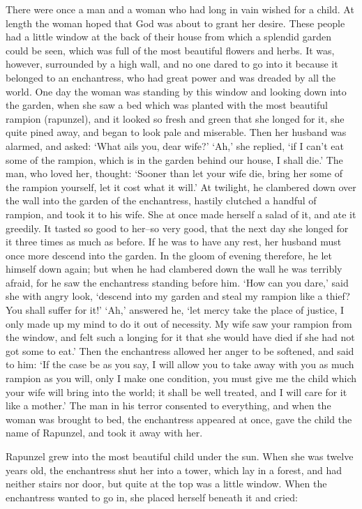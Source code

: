 \documentclass[oneside,11pt]{book} %
\begin{document}
There were once a man and a woman who had long in vain wished for a child. At length the woman hoped that God was about to grant her desire. These people had a little window at the back of their house from which a splendid garden could be seen, which was full of the most beautiful flowers and herbs. It was, however, surrounded by a high wall, and no one dared to go into it because it belonged to an enchantress, who had great power and was dreaded by all the world. One day the woman was standing by this window and looking down into the garden, when she saw a bed which was planted with the most beautiful rampion (rapunzel), and it looked so fresh and green that she longed for it, she quite pined away, and began to look pale and miserable. Then her husband was alarmed, and asked: `What ails you, dear wife?' `Ah,' she replied, `if I can't eat some of the rampion, which is in the garden behind our house, I shall die.' The man, who loved her, thought: `Sooner than let your wife die, bring her some of the rampion yourself, let it cost what it will.' At twilight, he clambered down over the wall into the garden of the enchantress, hastily clutched a handful of rampion, and took it to his wife. She at once made herself a salad of it, and ate it greedily. It tasted so good to her--so very good, that the next day she longed for it three times as much as before. If he was to have any rest, her husband must once more descend into the garden. In the gloom of evening therefore, he let himself down again; but when he had clambered down the wall he was terribly afraid, for he saw the enchantress standing before him. `How can you dare,' said she with angry look, `descend into my garden and steal my rampion like a thief? You shall suffer for it!' `Ah,' answered he, `let mercy take the place of justice, I only made up my mind to do it out of necessity. My wife saw your rampion from the window, and felt such a longing for it that she would have died if she had not got some to eat.' Then the enchantress allowed her anger to be softened, and said to him: `If the case be as you say, I will allow you to take away with you as much rampion as you will, only I make one condition, you must give me the child which your wife will bring into the world; it shall be well treated, and I will care for it like a mother.' The man in his terror consented to everything, and when the woman was brought to bed, the enchantress appeared at once, gave the child the name of Rapunzel, and took it away with her.

Rapunzel grew into the most beautiful child under the sun. When she was twelve years old, the enchantress shut her into a tower, which lay in a forest, and had neither stairs nor door, but quite at the top was a little window. When the enchantress wanted to go in, she placed herself beneath it and cried:
\end{document}
